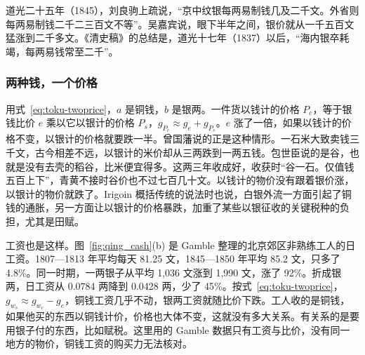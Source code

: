 道光二十五年（1845），刘良驹上疏说，“京中纹银每两易制钱几及二千文。外省则每两易制钱二千二三百文不等”\cite{xubiansheng}。吴嘉宾说，眼下半年之间，银价就从一千五百文猛涨到二千多文\cite{xubiansheng}。《清史稿》的总结是，道光十七年（1837）以后，“海内银卒耗竭，每两易钱常至二千”\cite{qingshigao}。


\subsubsection{两种钱，一个价格}
用式~\eqref{eq:toku-twoprice}，$a$ 是铜钱，$b$ 是银两。一件货以钱计的价格 $P_c$，等于银钱比价 $e$ 乘以它以银计的价格 $P_s$，$g_{P_c}\approx g_e+g_{P_s}$。$e$ 涨了一倍，如果以钱计的价格不变，以银计的价格就要跌一半。曾国藩说的正是这种情形。一石米大致卖钱三千文，古今相差不远，以银计的米价却从三两跌到一两五钱\cite{xubiansheng}。包世臣说的是谷，也就是没有去壳的稻谷，比米便宜得多。这两三年收成好，收获时“谷一石。仅值钱五百上下”，青黄不接时谷价也不过七百几十文\cite{xubiansheng}。以钱计的物价没有跟着银价涨，以银计的物价就跌了。Irigoin 概括传统的说法时也说，白银外流一方面引起了铜钱的通胀，另一方面让以银计的价格暴跌，加重了某些以银征收的关键税种的负担，尤其是田赋\cite{irigoin2013}。

工资也是这样。图~\ref{fig:qing_cash}(b) 是 Gamble 整理的北京郊区非熟练工人的日工资。1807—1813 年平均每天 81.25 文，1845—1850 年平均 85.2 文，只多了 4.8\%。同一时期，一两银子从平均 1,036 文涨到 1,990 文，涨了 92\%。折成银两，日工资从 0.0784 两降到 0.0428 两，少了 45\%\cite{gamble1943}。按式~\eqref{eq:toku-twoprice}，$g_{w_s}\approx g_{w_c}-g_e$，铜钱工资几乎不动，银两工资就随比价下跌。工人收的是铜钱，如果他买的东西以铜钱计价，价格也大体不变，这就没有多大关系。有关系的是要用银子付的东西，比如赋税。这里用的 Gamble 数据只有工资与比价，没有同一地方的物价，铜钱工资的购买力无法核对。

